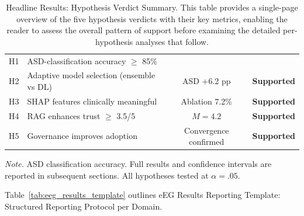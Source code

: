 {\tablestripes\tablefontsize
{}
\begin{xltabular}{\textwidth}{@{} l L C l @{}}
\caption[Headline Results: Hypothesis Verdict Summary]{Headline Results: Hypothesis Verdict Summary. This table provides a single-page overview of the five hypothesis verdicts with their key metrics, enabling the reader to assess the overall pattern of support before examining the detailed per-hypothesis analyses that follow.}\label{tab:headline_results} \\
\toprule
{} &  &  &  \\
\midrule
\endfirsthead
\endhead
\bottomrule
\endlastfoot
H1 & ASD-classification accuracy $\geq$ 85\% & \asdacc{} &  \\
H2 & Adaptive model selection (ensemble vs DL) & ASD +6.2 pp & \textbf{Supported} \\
H3 & SHAP features clinically meaningful & Ablation 7.2\% & \textbf{Supported} \\
H4 & RAG enhances trust $\geq$ 3.5/5 & $M = 4.2$ & \textbf{Supported} \\
H5 & Governance improves adoption & Convergence confirmed & \textbf{Supported} \\
\end{xltabular}}
\vspace{2pt}
\noindent\textit{Note.} ASD classification accuracy. Full results and confidence intervals are reported in subsequent sections. All hypotheses tested at $\alpha = .05$.

\iffalse %
\iffalse %

\noindent Table~\ref{tab:eeg_results_template} outlines eEG Results Reporting Template: Structured Reporting Protocol per Domain.

